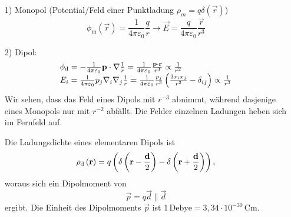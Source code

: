 \begin{enumerate}[1)]


	\item[1)] Monopol (Potential/Feld einer Punktladung $\rho _{m}=q\delta \left(\vec {r}\right)$)
		\begin{equation*}
			\phi _{\mathrm{m}}\left(\vec {r}\right)=\frac{1}{4\pi \varepsilon _{0}}\frac{q}{r}\rightarrow \vec {E}=\frac{q}{4\pi \varepsilon _{0}}\frac{\vec {r}}{r^{3}}
		\end{equation*}
	\item[2)] Dipol:
		\begin{equation*}
			\begin{array}{l}
				\phi _{\text{d} }=-\frac{1}{4\pi \varepsilon _{0}}\mathbf{p}\cdot \nabla \frac{1}{r}=\frac{1}{4\pi \varepsilon _{0}}\frac{\mathbf{p}\cdot \mathbf{r}}{r^{3}}\propto \frac{1}{r^{2}} \\
				E_{i}=\frac{1}{4\pi \varepsilon _{0}}p_{j}\nabla _{i}\nabla _{j}\frac{1}{r}=\frac{1}{4\pi \varepsilon _{0}}\frac{p_{j}}{r^{3}}\left(\frac{3x_{i}x_{j}}{r^{2}}-\delta _{ij}\right)\propto \frac{1}{r^{3}}
			\end{array}
		\end{equation*}
		Wir sehen, dass das Feld eines Dipols mit $r^{-3}$ abnimmt, während dasjenige eines Monopols nur mit $r^{-2}$ abfällt. Die Felder einzelnen Ladungen heben sich im Fernfeld auf.

		Die Ladungsdichte eines elementaren Dipols ist
		\begin{equation*}
			\rho _{\text{d} }\left(\mathbf{r}\right)=q\left(\delta \left(\mathbf{r}-\frac{\mathbf{d}}{2}\right)-\delta \left(\mathbf{r}+\frac{\mathbf{d}}{2}\right)\right),
		\end{equation*}
		woraus sich ein Dipolmoment von
		\begin{equation*}
			\vec {p}=q\vec {d}\parallel \vec {d}
		\end{equation*}
		ergibt. Die Einheit des Dipolmoments $\vec {p}$ ist $1\,\text{Debye}=3,34\cdot 10^{-30}\,\mathrm{Cm}$.


\end{enumerate}
